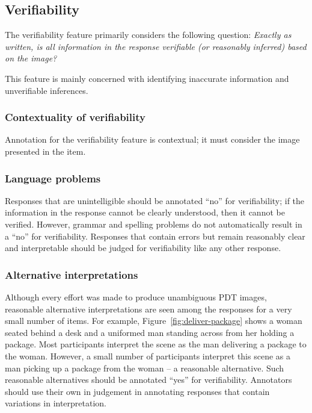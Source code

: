 \documentclass[12pt,notitlepage]{article}
\begin{document}
\subsection{Verifiability} \label{subsec:verifiability}

The verifiability feature primarily considers the following question: \textit{Exactly as written, is all information in the response verifiable (or reasonably inferred) based on the image?}

This feature is mainly concerned with identifying inaccurate information and unverifiable inferences. 

\subsubsection{Contextuality of verifiability} Annotation for the verifiability feature is contextual; it must consider the image presented in the item. 

\subsubsection{Language problems} Responses that are unintelligible should be annotated ``no'' for verifiability; if the information in the response cannot be clearly understood, then it cannot be verified. However, grammar and spelling problems do not automatically result in a ``no'' for verifiability. Responses that contain errors but remain reasonably clear and interpretable should be judged for verifiability like any other response.

\subsubsection{Alternative interpretations} Although every effort was made to produce unambiguous PDT images, reasonable alternative interpretations are seen among the responses for a very small number of items. For example, Figure~\ref{fig:deliver-package} shows a woman seated behind a desk and a uniformed man standing across from her holding a package. Most participants interpret the scene as the man delivering a package to the woman. However, a small number of participants interpret this scene as a man picking up a package from the woman -- a reasonable alternative. Such reasonable alternatives should be annotated ``yes'' for verifiability. Annotators should use their own in judgement in annotating responses that contain variations in interpretation.
\end{document}
